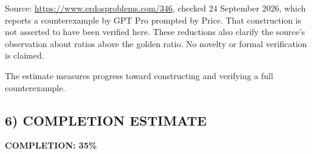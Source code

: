 Source: \url{https://www.erdosproblems.com/346}, checked 24 September 2026, which reports a counterexample by GPT Pro prompted by Price. That construction is not asserted to have been verified here. These reductions also clarify the source's observation about ratios above the golden ratio. No novelty or formal verification is claimed.

The estimate measures progress toward constructing and verifying a full counterexample.
\subsection*{6) COMPLETION ESTIMATE}
\textbf{COMPLETION: 35\%}
